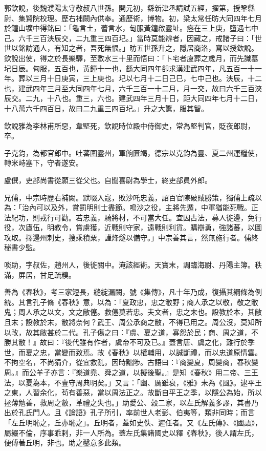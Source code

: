 \begin{pinyinscope}
 郭欽說，後魏濮陽太守敬叔八世孫。開元初，繇新津丞請試五經，擢第，授鞏縣尉、集賢院校理。歷右補闕內供奉。通歷術，博物。初，梁太常任昉大同四年七月於鐘山壙中得銘曰：「龜言土，蓍言水，甸服黃鐘啟靈址。瘞在三上庚，墮遇七中己。六千三百浹辰交，二九重三四百圮。」當時莫能辨者，因藏之，戒諸子曰：「世世以銘訪通人，有知之者，吾死無恨。」昉五世孫升之，隱居商洛，寫以授欽說。欽說出使，得之於長樂驛，至敷水三十里而悟曰：「卜宅者廋葬之歲月，而先識墓圮日辰。甸服，五百也，黃鐘十一也，繇大同四年卻求漢建武四年，凡五百一十一年。葬以三月十日庚寅，三上庚也。圮以七月十二日己巳，七中己也。浹辰，十二也，建武四年三月至大同四年七月，六千三百一十二月，月一交，故曰六千三百浹辰交。二九，十八也。重三，六也。建武四年三月十日，距大同四年七月十二日，十八萬六千四百日，故曰二九重三四百圮。」升之大驚，服其智。



 欽說雅為李林甫所惡，韋堅死，欽說時位殿中侍御史，常為堅判官，貶夜郎尉，卒。



 子克鈞，為都官郎中。吐蕃圍靈州，軍餉匱竭，德宗以克鈞為靈、夏二州運糧使，轉米峙塞下，守者遂安。



 盧僎，吏部尚書從願三從父也。自聞喜尉為學士，終吏部員外郎。



 兄俌，中宗時歷右補闕。默啜入寇，敗沙吒忠義，詔百官陳破賊勝策，獨俌上疏以為：「治內可以及外，賞罰明則士盡節。鳴沙之役，主將先遁，中軍猶能死戰。正法紀功，則戎行可勸。若忠義，騎將材，不可當大任。宜因古法，募人徙邊，免行役，次廬伍，明教令，賞虜獲，近戰則守家，遠戰則利貨。購辯勇，強諸蕃，以圖攻取。擇邊州刺史，搜乘積粟，謹烽燧以備守。」中宗善其言，然無施行者。俌終秘書少監。



 啖助，字叔佐，趙州人，後徙關中。淹該經術。天寶末，調臨海尉、丹陽主簿。秩滿，屏居，甘足疏糗。



 善為《春秋》，考三家短長，縫綻漏闕，號《集傳》，凡十年乃成，復攝其綱條為例統。其言孔子脩《春秋》意，以為：「夏政忠，忠之敝野；商人承之以敬，敬之敝鬼；周人承之以文，文之敝僿。救僿莫若忠。夫文者，忠之末也。設教於本，其敝且末；設教於末，敝將奈何？武王、周公承商之敝，不得已用之。周公沒，莫知所以改，故其敝甚於二代。孔子傷之曰：『虞、夏之道，寡怨於民；商、周之道，不勝其敝！』故曰：『後代雖有作者，虞帝不可及已。』蓋言唐、虞之化，難行於季世，而夏之忠，當變而致焉。故《春秋》以權輔用，以誠斷禮，而以忠道原情雲。不拘空名，不尚狷介，從宜救亂，因時黜陟。古語曰：『商變夏，周變商，春秋變周。』而公羊子亦言：『樂道堯、舜之道，以擬後聖。』是知《春秋》用二帝、三王法，以夏為本，不壹守周典明矣。」又言：「幽、厲雖衰，《雅》未為《風》。逮平王之東，人習余化，茍有善惡，當以周法正之。故斷自平王之季，以隱公為始，所以拯薄勉善，救周之敝，革禮之失也。」助愛公、穀二家，以左氏解義多謬，其書乃出於孔氏門人。且《論語》孔子所引，率前世人老彭、伯夷等，類非同時；而言「左丘明恥之，丘亦恥之」。丘明者，蓋如史佚、遲任者。又《左氏傳》、《國語》，屬綴不倫，序事乖剌，非一人所為。蓋左氏集諸國史以釋《春秋》，後人謂左氏，便傅著丘明，非也。助之鑿意多此類。




\end{pinyinscope}
